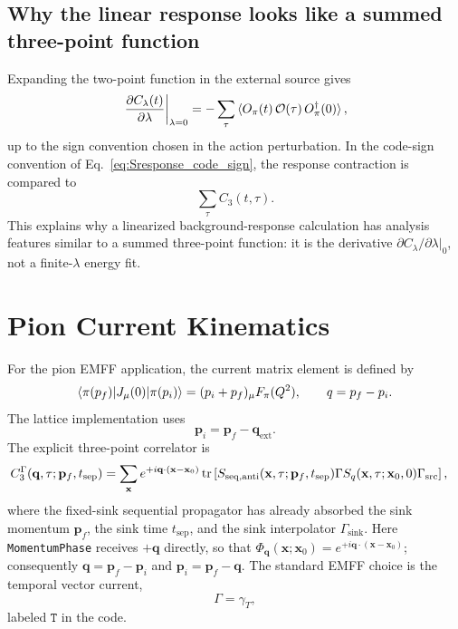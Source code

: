 \documentclass[11pt,a4paper]{article}
\newcommand{\Ocur}{\mathcal{O}}
\newcommand{\gsrc}{\Gamma_{\mathrm{src}}}
\newcommand{\gsink}{\Gamma_{\mathrm{sink}}}
\newcommand{\Cthree}{C_3}
\begin{document}
\subsection{Why the linear response looks like a summed three-point function}

Expanding the two-point function in the external source gives
\begin{equation}
  \left.
  \frac{\partial C_\lambda(t)}{\partial\lambda}
  \right|_{\lambda=0}
  =
  -\sum_\tau
  \braket{
    O_\pi(t)\,
    \Ocur(\tau)\,
    O_\pi^\dagger(0)
  },
\label{eq:dC_summed_3pt_sign}
\end{equation}
up to the sign convention chosen in the action perturbation.  In the code-sign
convention of Eq.~\eqref{eq:Sresponse_code_sign}, the response contraction is
compared to
\begin{equation}
  \sum_\tau \Cthree(t,\tau).
\end{equation}
This explains why a linearized background-response calculation has analysis
features similar to a summed three-point function: it is the derivative
\(\partial C_\lambda/\partial\lambda|_0\), not a finite-\(\lambda\) energy fit.

\section{Pion Current Kinematics}

For the pion EMFF application, the current matrix element is defined by
\begin{equation}
  \braket{\pi(p_f)|J_\mu(0)|\pi(p_i)}
  =
  (p_i+p_f)_\mu F_\pi(Q^2),
  \qquad
  q=p_f-p_i .
\end{equation}
The lattice implementation uses
\begin{equation}
  \mathbf p_i = \mathbf p_f - \mathbf q_{\mathrm{ext}}.
\end{equation}
The explicit three-point correlator is
\begin{align}
  \Cthree^\Gamma(\mathbf q,\tau;\mathbf p_f,t_{\mathrm{sep}})
  &=
  \sum_{\mathbf x}
  e^{+i\mathbf q\cdot(\mathbf x-\mathbf x_0)}
  \tr\left[
    S_{\mathrm{seq,anti}}(\mathbf x,\tau;\mathbf p_f,t_{\mathrm{sep}})
    \Gamma
    S_q(\mathbf x,\tau;\mathbf x_0,0)
    \gsrc
  \right],
\label{eq:explicit_emff_c3}
\end{align}
where the fixed-sink sequential propagator has already absorbed the sink
momentum \(\mathbf p_f\), the sink time \(t_{\mathrm{sep}}\), and the sink
interpolator \(\gsink\).  Here \texttt{MomentumPhase} receives
\(+\mathbf q\) directly, so that
\(\Phi_{\mathbf q}(\mathbf x;\mathbf x_0)
=e^{+i\mathbf q\cdot(\mathbf x-\mathbf x_0)}\); consequently
\(\mathbf q=\mathbf p_f-\mathbf p_i\) and
\(\mathbf p_i=\mathbf p_f-\mathbf q\).  The standard EMFF choice is the temporal vector
current,
\begin{equation}
  \Gamma = \gamma_T,
\end{equation}
labeled \(\texttt{T}\) in the code.
\end{document}
